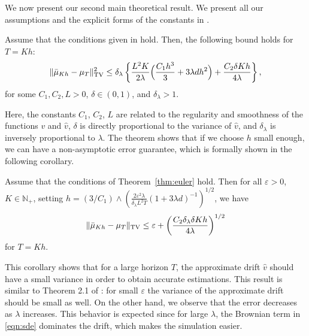 We now present our second main theoretical result. We present all our assumptions and the explicit forms of the constants in \supp. 
\vspace{-5pt}
\begin{thm}
\label{thm:euler}
Assume that the conditions given in \supp hold. Then, the following bound holds for $T=Kh$:
\begin{align}
\| \bar{\mu}_{Kh} - \mu_T \|_{\textnormal{TV}}^2 \leq \delta_\lambda \left \lbrace  \frac{L^2 K}{2\lambda} \Bigl( \frac{C_1 h^3}{3} + 3 \lambda d h^2 \Bigr) + \frac{C_2  \delta K h}{4\lambda} \right \rbrace	,
\end{align} 
for some $C_1,C_2,L >0$, $\delta \in (0,1)$, and $\delta_\lambda >1$.  %
\end{thm}
Here, the constants $C_1$, $C_2$, $L$ are related to the regularity and smoothness of the functions $v$ and $\hat{v}$, $\delta$ is directly proportional to the variance of $\hat{v}$, and $\delta_\lambda$ is inversely proportional to $\lambda$. The theorem shows that 
% 
if we choose $h$ small enough, we can have a non-asymptotic error guarantee, which is formally shown in the following corollary. 
\vspace{-5pt}
\begin{cor}
  \label{coro:precision}
  Assume that the conditions of Theorem~\ref{thm:euler} hold. Then for all $\varepsilon >0$, $K \in \mathbb{N}_+$, setting
$h = (3/C_1)\wedge\left(\frac{2 \varepsilon^2 \lambda}{\delta_\lambda L^2 T}(1+3\lambda d)^{-1}\right)^{1/2}$, %
  we have
  \begin{align}
    \| \bar{\mu}_{Kh} - \mu_T \|_{\textnormal{TV}} \leq \varepsilon + \left(\frac{C_2 \delta_\lambda \delta K h}{4\lambda}\right)^{1/2} 
  \end{align}
  for $T=Kh$.
\end{cor}
This corollary shows that for a large horizon $T$, the approximate drift $\hat{v}$ should have a small variance in order to obtain accurate estimations. This result is similar to Theorem 2.1 of \cite{raginsky17a}: for small $\varepsilon$ the variance of the approximate drift should be small as well. On the other hand, we observe that the error decreases as $\lambda$ increases. This behavior is expected since for large $\lambda$, the Brownian term in \eqref{eqn:sde} dominates the drift, which makes the simulation easier.

